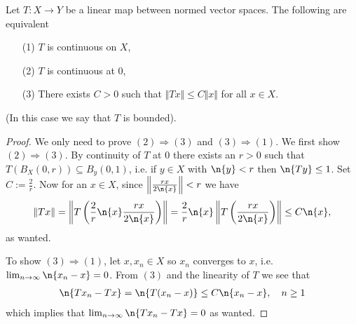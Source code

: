 \begin{proposition}\label{prop: linear map equivalences}
Let $T:X\to Y$ be a linear map between normed vector spaces. The following are equivalent
\begin{itemize}
\item[(1)] $T$ is continuous on $X$, \label{itm: cont on X}
\item[(2)] $T$ is continuous at 0, \label{enum: cont at 0}
\item[(3)] There exists $C>0$ such that $\Vert Tx \Vert \le C\Vert x \Vert$ for all $x\in X$. \label{enum: T bounded}
\end{itemize}
(In this case we say that $T$ is bounded).
\end{proposition}
\begin{proof}
We only need to prove $(2) \Rightarrow (3)$ and $(3)\Rightarrow (1)$. We first show $(2) \Rightarrow (3)$. By continuity of $T$ at $0$ there exists an $r>0$ such that $T(B_{X}(0,r))\subseteq B_{y}(0,1)$, i.e. if $y\in X$ with $\n{y} < r$ then $\n{Ty} \le 1$. Set $C:=\frac{2}{r}$. Now for an $x\in X$, since $\left\Vert \frac{rx}{2\n{x}} \right\Vert < r$ we have
\begin{align*}
	\Vert Tx \Vert = \left\Vert T\left( \frac{2}{r}\n{x} \frac{rx}{2\n{x}}  \right) \right\Vert = \frac{2}{r} \n{x} \left\Vert T\left( \frac{rx}{2\n{x}} \right) \right \Vert \le C \n{x},
\end{align*}
as wanted.

To show $(3)\Rightarrow (1)$, let $x,x_{n}\in X$ so $x_{n}$ converges to $x$, i.e. $\lim_{n\to \infty}\n{x_{n}-x}=0$. From $(3)$ and the linearity of $T$ we see that
\begin{align*}
	\n{Tx_{n}-Tx} = \n{T(x_{n}-x)} \le C\n{x_{n}-x}, \quad n\ge 1
\end{align*}
which implies that $\lim_{n\to \infty}\n{Tx_{n}-Tx}=0$ as wanted.
\end{proof}

